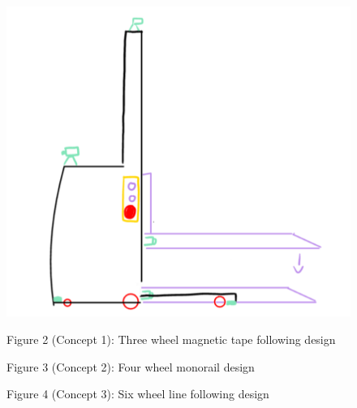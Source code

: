 \documentclass[12pt]{article}
\begin{document}
\begin{figure}[H]
\begin{minipage}{0.32\textwidth}
    \end{minipage}%
    \hspace{0.01\textwidth}
    \begin{minipage}{0.32\textwidth}
        \centering
        \includegraphics[width=\textwidth]{Louis' design without text.png}
    \end{minipage}
    \hspace{0.01\textwidth}
    

    \begin{minipage}{0.32\textwidth}
        \centering
        \textbf{}Figure 2 (Concept 1): Three wheel magnetic tape following design
    \end{minipage}%
    \hspace{0.5mm} %
    \begin{minipage}{0.32\textwidth}
        \centering
        \textbf{}Figure 3 (Concept 2): Four wheel monorail design 
    \end{minipage}%
    \hspace{0.5mm} %
    \begin{minipage}{0.32\textwidth}
        \centering
        \textbf{}Figure 4 (Concept 3): Six wheel line following design  %
    \end{minipage}
\end{figure}
 
\end{document}
